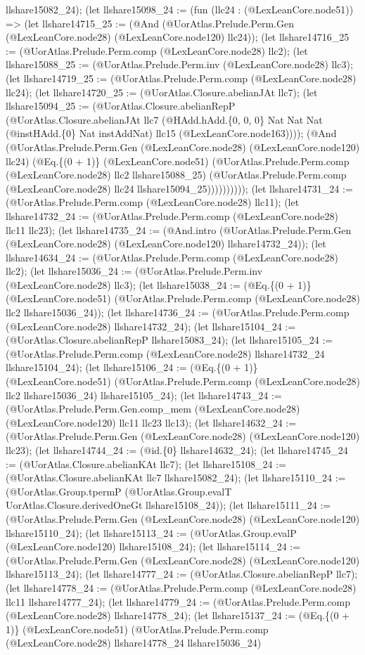 \documentclass[11pt]{article}
\begin{document}
llshare15082\_24); (let llshare15098\_24 := (fun (llc24 : (@LexLeanCore.node51)) => (let llshare14715\_25 := (@And (@UorAtlas.Prelude.Perm.Gen (@LexLeanCore.node28) (@LexLeanCore.node120) llc24)); (let llshare14716\_25 := (@UorAtlas.Prelude.Perm.comp (@LexLeanCore.node28) llc2); (let llshare15088\_25 := (@UorAtlas.Prelude.Perm.inv (@LexLeanCore.node28) llc3); (let llshare14719\_25 := (@UorAtlas.Prelude.Perm.comp (@LexLeanCore.node28) llc24); (let llshare14720\_25 := (@UorAtlas.Closure.abelianJAt llc7); (let llshare15094\_25 := (@UorAtlas.Closure.abelianRepP (@UorAtlas.Closure.abelianJAt llc7 (@HAdd.hAdd.\{0, 0, 0\} Nat Nat Nat (@instHAdd.\{0\} Nat instAddNat) llc15 (@LexLeanCore.node163)))); (@And (@UorAtlas.Prelude.Perm.Gen (@LexLeanCore.node28) (@LexLeanCore.node120) llc24) (@Eq.\{(0 + 1)\} (@LexLeanCore.node51) (@UorAtlas.Prelude.Perm.comp (@LexLeanCore.node28) llc2 llshare15088\_25) (@UorAtlas.Prelude.Perm.comp (@LexLeanCore.node28) llc24 llshare15094\_25)))))))))); (let llshare14731\_24 := (@UorAtlas.Prelude.Perm.comp (@LexLeanCore.node28) llc11); (let llshare14732\_24 := (@UorAtlas.Prelude.Perm.comp (@LexLeanCore.node28) llc11 llc23); (let llshare14735\_24 := (@And.intro (@UorAtlas.Prelude.Perm.Gen (@LexLeanCore.node28) (@LexLeanCore.node120) llshare14732\_24)); (let llshare14634\_24 := (@UorAtlas.Prelude.Perm.comp (@LexLeanCore.node28) llc2); (let llshare15036\_24 := (@UorAtlas.Prelude.Perm.inv (@LexLeanCore.node28) llc3); (let llshare15038\_24 := (@Eq.\{(0 + 1)\} (@LexLeanCore.node51) (@UorAtlas.Prelude.Perm.comp (@LexLeanCore.node28) llc2 llshare15036\_24)); (let llshare14736\_24 := (@UorAtlas.Prelude.Perm.comp (@LexLeanCore.node28) llshare14732\_24); (let llshare15104\_24 := (@UorAtlas.Closure.abelianRepP llshare15083\_24); (let llshare15105\_24 := (@UorAtlas.Prelude.Perm.comp (@LexLeanCore.node28) llshare14732\_24 llshare15104\_24); (let llshare15106\_24 := (@Eq.\{(0 + 1)\} (@LexLeanCore.node51) (@UorAtlas.Prelude.Perm.comp (@LexLeanCore.node28) llc2 llshare15036\_24) llshare15105\_24); (let llshare14743\_24 := (@UorAtlas.Prelude.Perm.Gen.comp\_mem (@LexLeanCore.node28) (@LexLeanCore.node120) llc11 llc23 llc13); (let llshare14632\_24 := (@UorAtlas.Prelude.Perm.Gen (@LexLeanCore.node28) (@LexLeanCore.node120) llc23); (let llshare14744\_24 := (@id.\{0\} llshare14632\_24); (let llshare14745\_24 := (@UorAtlas.Closure.abelianKAt llc7); (let llshare15108\_24 := (@UorAtlas.Closure.abelianKAt llc7 llshare15082\_24); (let llshare15110\_24 := (@UorAtlas.Group.tpermP (@UorAtlas.Group.evalT UorAtlas.Closure.derivedOneGt llshare15108\_24)); (let llshare15111\_24 := (@UorAtlas.Prelude.Perm.Gen (@LexLeanCore.node28) (@LexLeanCore.node120) llshare15110\_24); (let llshare15113\_24 := (@UorAtlas.Group.evalP (@LexLeanCore.node120) llshare15108\_24); (let llshare15114\_24 := (@UorAtlas.Prelude.Perm.Gen (@LexLeanCore.node28) (@LexLeanCore.node120) llshare15113\_24); (let llshare14777\_24 := (@UorAtlas.Closure.abelianRepP llc7); (let llshare14778\_24 := (@UorAtlas.Prelude.Perm.comp (@LexLeanCore.node28) llc11 llshare14777\_24); (let llshare14779\_24 := (@UorAtlas.Prelude.Perm.comp (@LexLeanCore.node28) llshare14778\_24); (let llshare15137\_24 := (@Eq.\{(0 + 1)\} (@LexLeanCore.node51) (@UorAtlas.Prelude.Perm.comp (@LexLeanCore.node28) llshare14778\_24 llshare15036\_24) 
\end{document}
